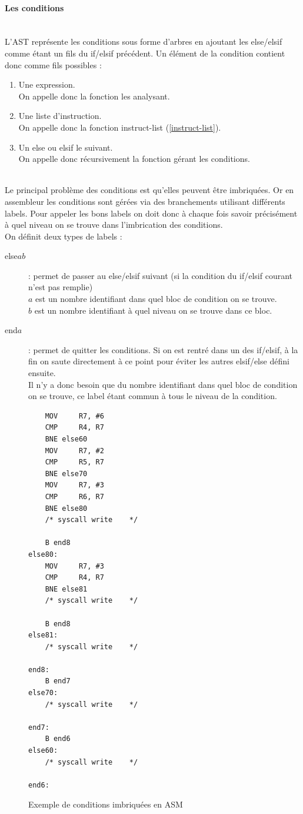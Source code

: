 \documentclass[a4paper,10pt]{article}
\begin{document}
		\paragraph{Les conditions}~\\
			L'AST représente les conditions sous forme d'arbres en ajoutant les else/elsif comme étant un fils du if/elsif précédent. Un élément de la condition contient donc comme fils possibles : 
			\begin{enumerate}
				\item Une expression.\\
					On appelle donc la fonction les analysant.
				\item Une liste d'instruction.\\
					On appelle donc la fonction instruct-list (\ref{instruct-list}).
				\item Un else ou elsif le suivant.\\
					On appelle donc récursivement la fonction gérant les conditions.
			\end{enumerate}
			~\\
			Le principal problème des conditions est qu'elles peuvent être imbriquées. Or en assembleur les conditions sont gérées via des branchements utilisant différents labels. Pour appeler les bons labels on doit donc à chaque fois savoir précisément à quel niveau on se trouve dans l'imbrication des conditions.\\
			On définit deux types de labels :\begin{description}
				\item[else$ab$] : permet de passer au else/elsif suivant (si la condition du if/elsif courant n'est pas remplie)\\
				$a$ est un nombre identifiant dans quel bloc de condition on se trouve.\\
				$b$ est un nombre identifiant à quel niveau on se trouve dans ce bloc.
				\item[end$a$] : permet de quitter les conditions. Si on est rentré dans un des if/elsif, à la fin on saute directement à ce point pour éviter les autres elsif/else défini ensuite.\\
				Il n'y a donc besoin que du nombre identifiant dans quel bloc de condition on se trouve, ce label étant commun à tous le niveau de la condition.
			\end{description}
\begin{figure}[H]
\begin{lstlisting}
	MOV 	R7, #6
	CMP		R4, R7
	BNE else60
	MOV 	R7, #2
	CMP		R5, R7
	BNE else70
	MOV 	R7, #3
	CMP		R6, R7
	BNE else80
	/* syscall write	*/ 

	B end8
else80: 
	MOV 	R7, #3
	CMP		R4, R7
	BNE else81
	/* syscall write	*/ 

	B end8
else81: 
	/* syscall write	*/ 

end8:
	B end7
else70: 
	/* syscall write	*/ 

end7:
	B end6
else60: 
	/* syscall write	*/ 

end6:
\end{lstlisting}
\fontfamily{}
\caption{Exemple de conditions imbriquées en ASM}
\label{lst:ExCond}
\end{figure}
\end{document}
